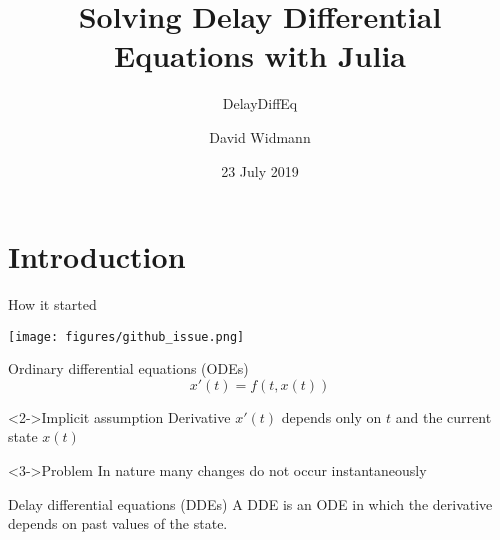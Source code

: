 \documentclass[aspectratio=169]{beamer}
\title{Solving Delay Differential Equations with Julia}
\subtitle{DelayDiffEq}
\author{David Widmann}
\date{23 July 2019}
\institute{JuliaCon 2019}
\begin{document}
\maketitle

\section{Introduction}

\begin{frame}{How it started}
  \begin{center}
    \texttt{[image: figures/github\_issue.png]}
  \end{center}
\end{frame}

\begin{frame}{Ordinary differential equations (ODEs)}
  \begin{equation*}
    x'(t) = f(t, x(t))
  \end{equation*}

  \begin{block}<2->{Implicit assumption}
    Derivative $x'(t)$ depends only on $t$ and the current state $x(t)$
  \end{block}

  \begin{alertblock}<3->{Problem}
    In nature many changes do not occur instantaneously
  \end{alertblock}
\end{frame}

\begin{frame}{Delay differential equations (DDEs)}
  A DDE is an ODE in which the derivative depends on past values of the state.






\end{frame}
\end{document}
